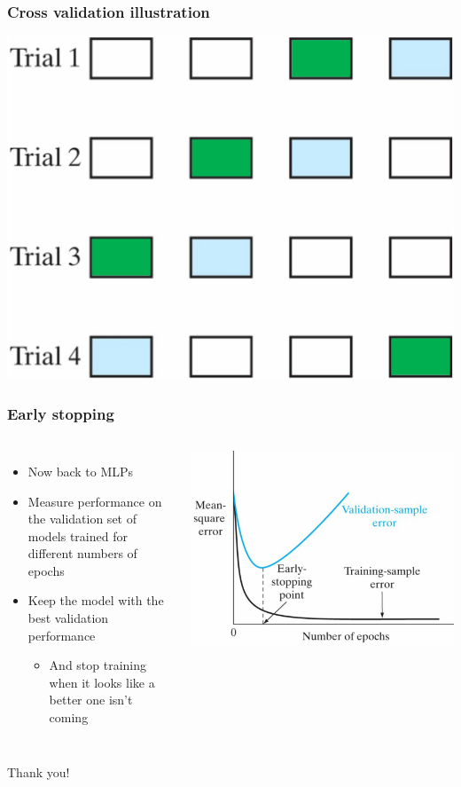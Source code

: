 \documentclass[12pt,notes,mathserif]{beamer}
\newcommand{\chuhao}{\fontsize{44.9pt}{\baselineskip}\selectfont}
\begin{document}
\begin{frame}[c]
	\frametitle{Cross validation illustration}
	\begin{center}
		\includegraphics[width=0.61\linewidth]{fig/lec516.jpg}
	\end{center}
\end{frame}

\begin{frame}[c]
	\frametitle{Early stopping}
	\begin{columns}
		\begin{itemize}
			\item Now back to MLPs
			\item Measure performance on the validation set of models
			      trained for different numbers of epochs
			\item Keep the model with the best validation performance
			      \begin{itemize}
				      \item And stop training when it looks like a better one isn't coming
			      \end{itemize}
		\end{itemize}

		\begin{center}
			\hspace*{-1.3cm}
			\includegraphics[width=1.6\textwidth]{fig/lec517.jpg}
		\end{center}
	\end{columns}
\end{frame}









\begin{frame}
	\begin{center}
		\chuhao Thank you! %
	\end{center}
\end{frame}
\end{document}
